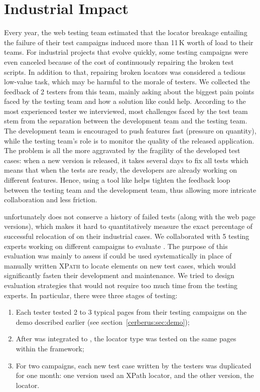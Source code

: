 \section{Industrial Impact}\label{cerberus:sec:impact}
Every year, the \laredoute{} web testing team estimated that the locator breakage entailing the failure of their test campaigns induced more than 11\,K\texteuro{} worth of load to their teams.
For industrial projects that evolve quickly, some testing campaigns were even canceled because of the cost of continuously repairing the broken test scripts.
In addition to that, repairing broken locators was considered a tedious low-value task, which may be harmful to the morale of testers. 
We collected the feedback of 2 testers from this team, mainly asking about the biggest pain points faced by the testing team and how a solution like \erratum could help. 
According to the most experienced tester we interviewed, most challenges faced by the test team stem from the separation between the development team and the testing team.
The development team is encouraged to push features fast (pressure on quantity), while the testing team's role is to monitor the quality of the released application.
The problem is all the more aggravated by the fragility of the developed test cases: when a new version is released, it takes several days to fix all tests which means that when the tests are ready, the developers are already working on different features.
Hence, using a tool like \erratum helps tighten the feedback loop between the testing team and the development team, thus allowing more intricate collaboration and less friction.

\laredoute{} unfortunately does not conserve a history of failed tests (along with the web page versions), which makes it hard to quantitatively measure the exact percentage of successful relocation of \erratum on their industrial cases.
We collaborated with 5 testing experts working on different campaigns to evaluate \erratum. 
The purpose of this evaluation was mainly to assess if \erratum could be used systematically in place of manually written \textsc{XPath} to locate elements on new test cases, which would significantly fasten their development and maintenance.
We tried to design evaluation strategies that would not require too much time from the testing experts.
In particular, there were three stages of testing:
\begin{enumerate}
    \item Each tester tested 2 to 3 typical pages from their testing campaigns on the demo described earlier (see section~\ref{cerberus:sec:demo});
    \item After \erratum was integrated to \cerberus, the \erratum locator type was tested on the same pages within the \cerberus framework;
    \item For two campaigns, each new test case written by the testers was duplicated for one month: one version used an XPath locator, and the other version, the \erratum locator.
\end{enumerate}

